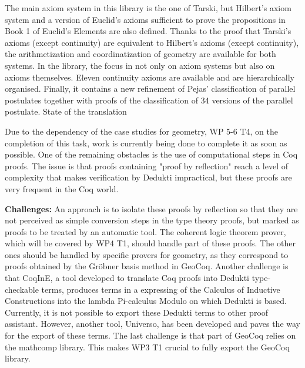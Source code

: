 \begin{workpackage}[id=libraries,wphases=0-48,type=RTD,
  short=Libraries,%
  title=Libraries,
  lead=Inr,
  InrRM=10,
  TumRM=42]
\begin{tasklist}
\begin{task}[id=geocoq,title=The GeoCoq library]
The main axiom system in this library is the one of Tarski, but Hilbert's axiom system and a version of Euclid's axioms sufficient to prove the propositions in Book 1 of Euclid's Elements are also defined. Thanks to the proof that Tarski's axioms (except continuity) are equivalent to Hilbert's axioms (except continuity), the arithmetization and coordinatization of geometry are available for both systems. In the library, the focus in not only on axiom systems but also on axioms themselves. Eleven continuity axioms are available and are hierarchically organised. Finally, it contains a new refinement of Pejas' classification of parallel postulates together with proofs of the classification of 34 versions of the parallel postulate.
State of the translation

Due to the dependency of the case studies for geometry, WP 5-6 T4, on the completion of this task, work is currently being done to complete it as soon as possible. One of the remaining obstacles is the use of computational steps in Coq proofs. The issue is that proofs containing "proof by reflection" reach a level of complexity that makes verification by Dedukti impractical, but these proofs are very frequent in the Coq world.

\textbf{Challenges:}
An approach is to isolate these proofs by reflection so that they are not perceived as simple conversion steps in the type theory proofs, but marked as proofs to be treated by an automatic tool. The coherent logic theorem prover, which will be covered by WP4 T1, should handle part of these proofs. The other ones should be handled by specific provers for geometry, as they correspond to proofs obtained by the Gr\"obner basis method in GeoCoq.
Another challenge is that CoqInE, a tool developed to translate Coq proofs into Dedukti type-checkable terms, produces terms in a expressing of the Calculus of Inductive Constructions into the lambda Pi-calculus Modulo on which Dedukti is based. Currently, it is not possible to export these Dedukti terms to other proof assistant. However, another tool, Universo, has been developed and paves the way for the export of these terms.
The last challenge is that part of GeoCoq relies on the mathcomp library. This makes WP3 T1 crucial to fully export the GeoCoq library.


\end{task}
\end{tasklist}
\end{workpackage}
